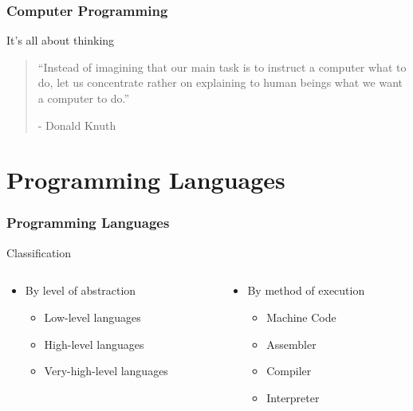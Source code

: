 \documentclass[10pt, compress]{beamer}
\begin{document}
\begin{frame}[fragile]
	\frametitle{Computer Programming}
	\begin{block}{It's all about thinking}
		\begin{quote}
		``Instead of imagining that our main task is to instruct a computer what to do, let us concentrate rather on explaining to human beings what we want a computer to do.''
		\begin{flushright}
		- Donald Knuth
		\end{flushright}
		\end{quote}
	\end{block}
\end{frame}

\section{Programming Languages}

\begin{frame}[fragile]
	\frametitle{Programming Languages}
	\begin{block}{Classification}
		\begin{columns}
			\begin{column}{0.5\textwidth}
			\begin{itemize}
				\item[] By level of abstraction
				\begin{itemize}
					\item[] Low-level languages
					\item[] High-level languages
					\item[] Very-high-level languages
				\end{itemize}
			\end{itemize}
			\end{column}
			\begin{column}{0.5\textwidth}
			\begin{itemize}
				\item[] By method of execution
				\begin{itemize}
					\item[] Machine Code
					\item[] Assembler
					\item[] Compiler
					\item[] Interpreter
				\end{itemize}
			\end{itemize}
			\end{column}
		\end{columns}
	\end{block}
\end{frame}
\end{document}
